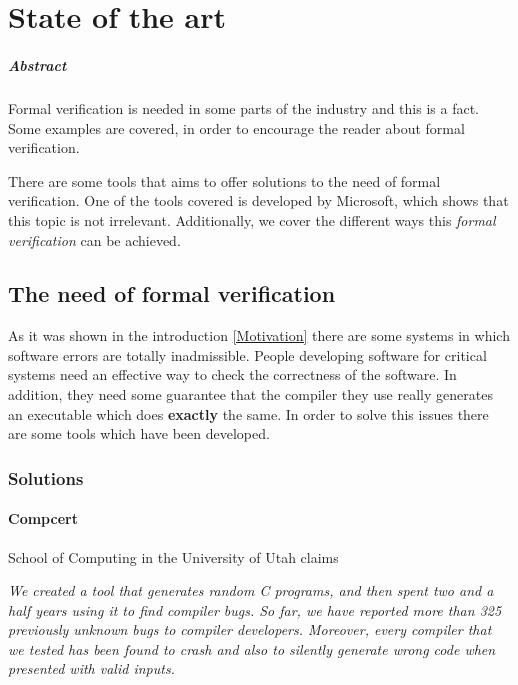 \chapter{State of the art\label{sec:estado_del_arte}}

\paragraph{Abstract}

Formal verification is needed in some parts of the industry and this is a fact. 
%
Some examples are covered, in order to encourage the reader about formal verification.

There are some tools that aims to offer solutions to the need of formal verification. 
%
One of the tools covered is developed by Microsoft, which shows that this topic is not irrelevant.
%
Additionally, we cover the different ways this \textit{formal verification} can be achieved.



\section{The need of formal verification}

As it was shown in the introduction \ref{Motivation} there are some systems in which software errors are totally inadmissible.
%
People developing software for critical systems need an effective way to check the correctness of the software.
%
In addition, they need some guarantee that the compiler they use really generates an executable which does \textbf{exactly} the same.
%
In order to solve this issues there are some tools which have been developed.

\subsection{Solutions}

\subsubsection{Compcert}

School of Computing in the University of Utah claims \cite{CCompilerMotivation}

\textit{We created a tool that generates random C programs, and then spent two and a half years using it to find compiler bugs. So far, we have reported more than 325 previously unknown bugs to compiler developers. Moreover, every compiler that we tested has been found to crash and also to silently generate wrong code when presented with valid inputs.}

